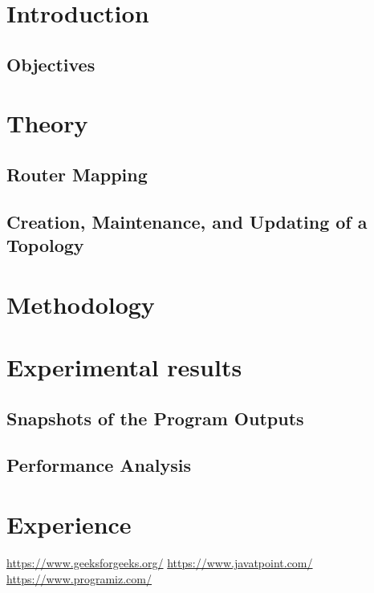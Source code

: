 \documentclass[11pt]{article}
\begin{document}
\tableofcontents

\newpage
\section{Introduction}

\subsection{Objectives}


\section{Theory}

\subsection{Router Mapping}

\subsection{Creation, Maintenance, and Updating of a Topology}

\section{Methodology}

\section{Experimental results}

\subsection{Snapshots of the Program Outputs}

\subsection{Performance Analysis}

\section{Experience}
    
\begin{thebibliography}{1}
     \url{https://www.geeksforgeeks.org/}
     \url{https://www.javatpoint.com/}
     \url{https://www.programiz.com/}
\end{thebibliography}
\end{document}
